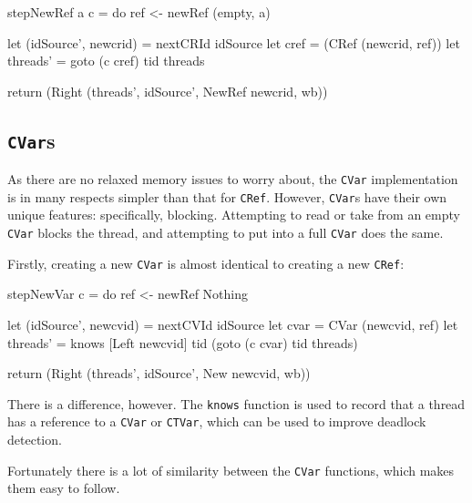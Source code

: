 \begin{haskellcode}
stepNewRef a c = do
  ref <- newRef (empty, a)

  let (idSource', newcrid) = nextCRId idSource
  let cref = (CRef (newcrid, ref))
  let threads' = goto (c cref) tid threads

  return (Right (threads', idSource', NewRef newcrid, wb))
\end{haskellcode}

\subsection{\texttt{CVar}s}
\label{sec:execution-stepwise-cvar}

As there are no relaxed memory issues to worry about, the \verb|CVar|
implementation is in many respects simpler than that for
\verb|CRef|. However, \verb|CVar|s have their own unique features:
specifically, blocking. Attempting to read or take from an empty
\verb|CVar| blocks the thread, and attempting to put into a full
\verb|CVar| does the same.

Firstly, creating a new \verb|CVar| is almost identical to creating a
new \verb|CRef|:

\begin{haskellcode}
stepNewVar c = do
  ref <- newRef Nothing

  let (idSource', newcvid) = nextCVId idSource
  let cvar = CVar (newcvid, ref)
  let threads' = knows [Left newcvid] tid
                 (goto (c cvar) tid threads)

  return (Right (threads', idSource', New newcvid, wb))
\end{haskellcode}

There is a difference, however. The \verb|knows| function is used to
record that a thread has a reference to a \verb|CVar| or \verb|CTVar|,
which can be used to improve deadlock detection.

Fortunately there is a lot of similarity between the \verb|CVar|
functions, which makes them easy to follow.


